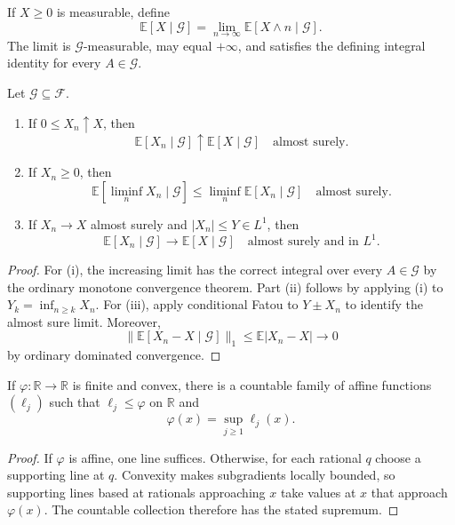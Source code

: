 \begin{de}
If $X\geq0$ is measurable, define
\[
\mathbb E[X\mid\mathcal G]
 =\lim_{n\to\infty}\mathbb E[X\wedge n\mid\mathcal G].
\]
The limit is $\mathcal G$-measurable, may equal $+\infty$, and satisfies the
defining integral identity for every $A\in\mathcal G$.
\end{de}

\begin{thm}
Let $\mathcal G\subseteq\mathcal F$.
\begin{enumerate}[label=(\roman*)]
  \item If $0\leq X_n\uparrow X$, then
  \[
  \mathbb E[X_n\mid\mathcal G]
   \uparrow\mathbb E[X\mid\mathcal G]
  \quad\text{almost surely}.
  \]
  \item If $X_n\geq0$, then
  \[
  \mathbb E[\liminf_nX_n\mid\mathcal G]
   \leq\liminf_n\mathbb E[X_n\mid\mathcal G]
  \quad\text{almost surely}.
  \]
  \item If $X_n\to X$ almost surely and $|X_n|\leq Y\in L^1$, then
  \[
  \mathbb E[X_n\mid\mathcal G]\to
  \mathbb E[X\mid\mathcal G]
  \quad\text{almost surely and in }L^1.
  \]
\end{enumerate}
\end{thm}

\begin{proof}
For (i), the increasing limit has the correct integral over every
$A\in\mathcal G$ by the ordinary monotone convergence theorem. Part (ii)
follows by applying (i) to
$Y_k=\inf_{n\geq k}X_n$. For (iii), apply conditional Fatou to
$Y\pm X_n$ to identify the almost sure limit. Moreover,
\[
\|\mathbb E[X_n-X\mid\mathcal G]\|_1
 \leq\mathbb E|X_n-X|\to0
\]
by ordinary dominated convergence.
\end{proof}

\begin{lem}
If $\varphi:\mathbb R\to\mathbb R$ is finite and convex, there is a countable
family of affine functions $(\ell_j)$ such that
$\ell_j\leq\varphi$ on $\mathbb R$ and
\[
\varphi(x)=\sup_{j\geq1}\ell_j(x).
\]
\end{lem}

\begin{proof}
If $\varphi$ is affine, one line suffices. Otherwise, for each rational $q$
choose a supporting line at $q$. Convexity makes subgradients locally bounded,
so supporting lines based at rationals approaching $x$ take values at $x$
that approach $\varphi(x)$. The countable collection therefore has the
stated supremum.
\end{proof}

